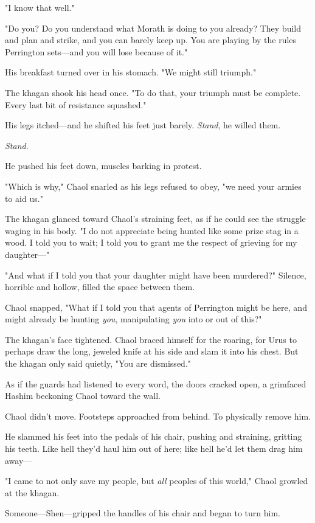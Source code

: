 "I know that well."

"Do you? Do you understand what Morath is doing to you already? They build and plan and strike, and you can barely keep up. You are playing by the rules Perrington sets---and you will lose because of it."

His breakfast turned over in his stomach. "We might still triumph."

The khagan shook his head once. "To do that, your triumph must be complete. Every last bit of resistance squashed."

His legs itched---and he shifted his feet just barely. \emph{Stand}, he willed them.

\emph{Stand}.

He pushed his feet down, muscles barking in protest.

"Which is why," Chaol snarled as his legs refused to obey, "we need your armies to aid us."

The khagan glanced toward Chaol's straining feet, as if he could see the struggle waging in his body. "I do not appreciate being hunted like some prize stag in a wood. I told you to wait; I told you to grant me the respect of grieving for my daughter---"

"And what if I told you that your daughter might have been murdered?" Silence, horrible and hollow, filled the space between them.

Chaol snapped, "What if I told you that agents of Perrington might be here, and might already be hunting \emph{you}, manipulating \emph{you}
into or out of this?"

The khagan's face tightened. Chaol braced himself for the roaring, for Urus to perhaps draw the long, jeweled knife at his side and slam it into his chest. But the khagan only said quietly, "You are dismissed."

As if the guards had listened to every word, the doors cracked open, a grimfaced Hashim beckoning Chaol toward the wall.

Chaol didn't move. Footsteps approached from behind. To physically remove him.

He slammed his feet into the pedals of his chair, pushing and straining, gritting his teeth. Like hell they'd haul him out of here; like hell he'd let them drag him away---

"I came to not only save my people, but \emph{all} peoples of this world," Chaol growled at the khagan.

Someone---Shen---gripped the handles of his chair and began to turn him.

